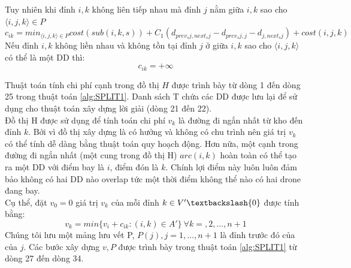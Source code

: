 \documentclass[a4paper,12pt]{report}
\begin{document}
Tuy nhiên khi đỉnh $i,k$ không liên tiếp nhau mà đỉnh $j$ nằm giữa $i,k$ sao cho $\langle i,j,k \rangle \in P$
$$
c_{ik}=min_{\langle i,j,k \rangle \in P} cost(sub(i,k,s))+C_1(d_{prev_sj,next_sj}-d_{prev_sj,j}-d_{j,next_sj})+cost(i,j,k)
$$
Nếu đỉnh $i,k$ không liền nhau và không tồn tại đỉnh $j$ ở giữa $i,k$ sao cho $\langle i,j,k \rangle$ có thể là một DD thì:
$$c_{ik}=+\infty$$

Thuật toán tính chi phí cạnh trong đồ thị $H$ được trình bày từ dòng 1 đến dòng 25 trong thuật toán \ref{alg:SPLIT1}. Danh sách T chứa các DD được lưu lại để sử dụng cho thuật toán xây dựng lời giải (dòng 21 đến 22). \\

Đồ thị H được sử dụng để tính toán chi phí $v_k$ là đường đi ngắn nhất từ kho đến đỉnh $k$. Bởi vì đồ thị xây dựng là có hướng và không có chu trình nên giá trị $v_k$ có thể tính dễ dàng bằng thuật toán quy hoạch động. Hơn nữa, một cạnh trong đường đi ngắn nhất (một cung trong đồ thị H) $arc(i,k)$ hoàn toàn có thể tạo ra một DD với điểm bay là $i$, điểm đón là $k$. Chính lợi điểm này luôn luôn đảm bảo không có hai DD nào overlap tức một thời điểm không thể nào có hai drone đang bay.  \\

Cụ thể, đặt $v_0=0$ giá trị $v_k$ của mỗi đỉnh $k \in V'\textbackslash \{0\}$ được tính bằng: 
$$v_k=min\{v_i+c_{ik}:(i,k) \in A'\} \ \forall k=,2,\ldots,n+1$$
Chúng tôi lưu một mảng lưu vết P, $P(j), j=1,\ldots,n+1 $ là đỉnh trước đó của của $j$. Các bước xây dựng $v,P$ được trình bày trong thuật toán \ref{alg:SPLIT1} từ dòng 27 đến dòng 34. 
\end{document}
